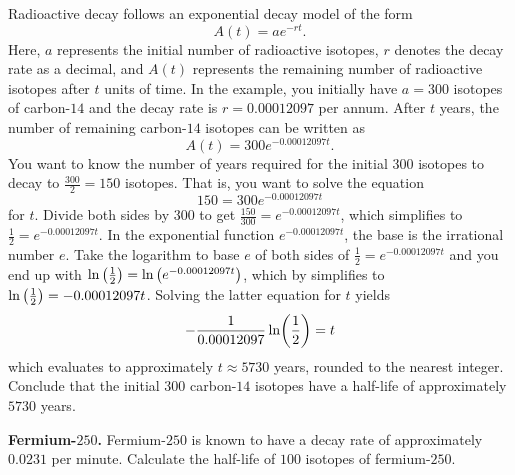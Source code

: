 \documentclass[a4paper,oneside,12pt]{article}
\begin{document}
\begin{solution}
Radioactive decay follows an exponential decay model of the form
\[
A(t)
=
a e^{-rt}.
\]
Here, $a$ represents the initial number of radioactive isotopes, $r$
denotes the decay rate as a decimal, and $A(t)$ represents the
remaining number of radioactive isotopes after $t$ units of time.  In
the example, you initially have $a = 300$ isotopes of carbon-$14$ and
the decay rate is $r = 0.00012097$ per annum.  After $t$ years, the
number of remaining carbon-$14$ isotopes can be written as
\[
A(t)
=
300 e^{-0.00012097 t}.
\]
You want to know the number of years required for the initial $300$
isotopes to decay to $\frac{300}{2} = 150$ isotopes.  That is, you
want to solve the equation
\[
150
=
300 e^{-0.00012097 t}
\]
for $t$.  Divide both sides by $300$ to get
$\frac{150}{300} = e^{-0.00012097 t}$, which simplifies to
$\frac{1}{2} = e^{-0.00012097 t}$.  In the exponential function
$e^{-0.00012097 t}$, the base is the irrational number $e$.  Take the
logarithm to base $e$ of both sides of
$\frac{1}{2} = e^{-0.00012097 t}$ and you end up with
$\ln \big(\frac{1}{2}\big) = \ln \big(e^{-0.00012097 t}\big)$,
which by  simplifies to
$\ln \big(\frac{1}{2}\big) = -0.00012097 t$.  Solving the latter
equation for $t$ yields
\[
-\frac{1}{0.00012097}
\ln \parenthesis*{\frac{1}{2}}
=
t
\]
which evaluates to approximately $t \approx 5730$ years, rounded to
the nearest integer.  Conclude that the initial $300$ carbon-$14$
isotopes have a half-life of approximately $5730$ years.
\end{solution}

\begin{exercise}
\textbf{Fermium-$250$.}
Fermium-$250$ is known to have a decay rate of approximately $0.0231$
per minute.  Calculate the half-life of $100$ isotopes of
fermium-$250$.
\end{exercise}

\end{document}
